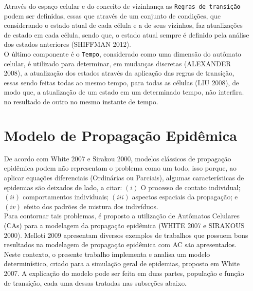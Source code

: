 \documentclass[a4paper,12pt]{article}
\begin{document}
Através do espaço celular e do conceito de vizinhança as \texttt{Regras de transição} podem ser definidas, essas que através de um conjunto de condições, que considerando o estado atual de cada célula e a de seus vizinhos, faz atualizações de estado em cada célula, sendo que, o estado atual sempre é definido pela análise dos estados anteriores (SHIFFMAN 2012\cite{Shiffman2012}).\\

O último componente é o \texttt{Tempo}, considerado como uma dimensão do autômato celular, é utilizado para determinar, em mudanças discretas (ALEXANDER 2008\cite{alexanderschatten2008}), a atualização dos estados através da aplicação das regras de transição, essas sendo feitas todas ao mesmo tempo, para todas as células (LIU 2008\cite{Liu2008}), de modo que, a atualização de um estado em um determinado tempo, não interfira. no resultado de outro no mesmo instante de tempo.

\newpage
\section{Modelo de Propagação Epidêmica}
De acordo com White 2007\cite{White2007} e Sirakou 2000\cite{Sirakoulis2000}, modelos clássicos de propagação epidêmica podem não representam o problema como um todo, isso porque, ao aplicar equações diferenciais (Ordinárias ou Parciais), algumas características de epidemias são deixados de lado, a citar: $(i)$ O processo de contato individual; $(ii)$ comportamentos individuais; $(iii)$ aspectos espaciais da propagação; e $(iv)$ efeito dos padrões de mistura dos indivíduos.\\

Para contornar tais problemas, é proposto a utilização de Autômatos Celulares (CAs) para a modelagem da propagação epidêmica (WHITE 2007\cite{White2007} e  SIRAKOUS 2000\cite{Sirakoulis2000}). Melloti 2009\cite{Melotti2009} apresentam diversos exemplos de trabalhos que possuem bons resultados na modelagem de propagação epidêmica com AC são apresentados.\\

Neste contexto, o presente trabalho implementa e analisa um modelo determinístico, criado para a simulação geral de epidemias, proposto em White 2007\cite{White2007}. A explicação do modelo pode ser feita em duas partes, população e função de transição, cada uma dessas tratadas nas subseções abaixo.
\end{document}
